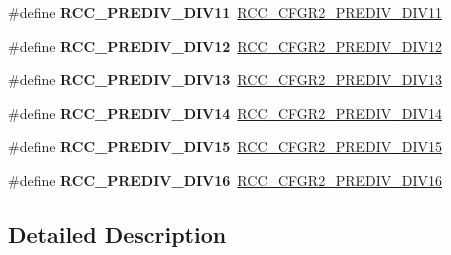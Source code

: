 \begin{DoxyCompactItemize}
\#define {\bfseries R\+C\+C\+\_\+\+P\+R\+E\+D\+I\+V\+\_\+\+D\+I\+V11}~\hyperlink{group___peripheral___registers___bits___definition_gac9932904c30e68bb7b52cea28cbeae69}{R\+C\+C\+\_\+\+C\+F\+G\+R2\+\_\+\+P\+R\+E\+D\+I\+V\+\_\+\+D\+I\+V11}
\item 
\mbox{\label{group___r_c_c___p_l_l___prediv___factor_gaa9e78335fec5e3bd0dae86b9f910c747}} 
\#define {\bfseries R\+C\+C\+\_\+\+P\+R\+E\+D\+I\+V\+\_\+\+D\+I\+V12}~\hyperlink{group___peripheral___registers___bits___definition_ga5402db0b8522c06ce3e1ff6813a508f0}{R\+C\+C\+\_\+\+C\+F\+G\+R2\+\_\+\+P\+R\+E\+D\+I\+V\+\_\+\+D\+I\+V12}
\item 
\mbox{\label{group___r_c_c___p_l_l___prediv___factor_ga20d799fa180ed5bed7438c86bb1947be}} 
\#define {\bfseries R\+C\+C\+\_\+\+P\+R\+E\+D\+I\+V\+\_\+\+D\+I\+V13}~\hyperlink{group___peripheral___registers___bits___definition_gae35fc61c8c5b86c6b1d484a132bb3e45}{R\+C\+C\+\_\+\+C\+F\+G\+R2\+\_\+\+P\+R\+E\+D\+I\+V\+\_\+\+D\+I\+V13}
\item 
\mbox{\label{group___r_c_c___p_l_l___prediv___factor_ga85bd9c256f8e13657438d91890362e5b}} 
\#define {\bfseries R\+C\+C\+\_\+\+P\+R\+E\+D\+I\+V\+\_\+\+D\+I\+V14}~\hyperlink{group___peripheral___registers___bits___definition_ga7d58f429410f5aaa9475a3a4b63492bc}{R\+C\+C\+\_\+\+C\+F\+G\+R2\+\_\+\+P\+R\+E\+D\+I\+V\+\_\+\+D\+I\+V14}
\item 
\mbox{\label{group___r_c_c___p_l_l___prediv___factor_gab7ef485052778fc649ca7099b59f2b64}} 
\#define {\bfseries R\+C\+C\+\_\+\+P\+R\+E\+D\+I\+V\+\_\+\+D\+I\+V15}~\hyperlink{group___peripheral___registers___bits___definition_ga579a0cc7dcca708fef65e3217c55666e}{R\+C\+C\+\_\+\+C\+F\+G\+R2\+\_\+\+P\+R\+E\+D\+I\+V\+\_\+\+D\+I\+V15}
\item 
\mbox{\label{group___r_c_c___p_l_l___prediv___factor_ga5ace6f1b93f6b88adc80690165df13e1}} 
\#define {\bfseries R\+C\+C\+\_\+\+P\+R\+E\+D\+I\+V\+\_\+\+D\+I\+V16}~\hyperlink{group___peripheral___registers___bits___definition_ga95d845a26c3d1e98a883e6e1007c401e}{R\+C\+C\+\_\+\+C\+F\+G\+R2\+\_\+\+P\+R\+E\+D\+I\+V\+\_\+\+D\+I\+V16}
\end{DoxyCompactItemize}


\subsection{Detailed Description}
